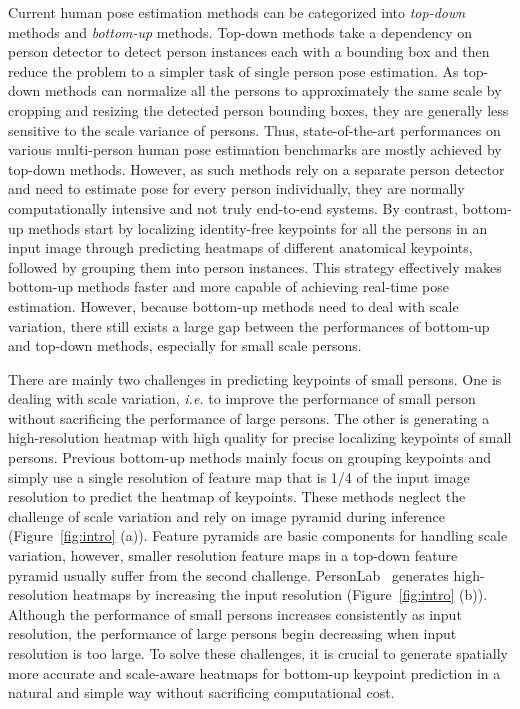 \documentclass[10pt,twocolumn,letterpaper]{article}
\begin{document}
Current human pose estimation methods can be categorized into \emph{top-down} methods and \emph{bottom-up} methods. Top-down methods \cite{papandreou2017towards,chen2018cascaded,he2017mask,xiao2018simple,sun2019deep,WangSCJDZLMTWLX19,sun2018integral,he2017mask} take a dependency on person detector to detect person instances each with a bounding box and then reduce the problem to a simpler task of single person pose estimation. As top-down methods can normalize all the persons to approximately the same scale by cropping and resizing the detected person bounding boxes, they are generally less sensitive to the scale variance of persons. Thus, state-of-the-art performances on various multi-person human pose estimation benchmarks are mostly achieved by top-down methods. However, as such methods rely on a separate person detector and need to estimate pose for every person individually, they are normally computationally intensive and not truly end-to-end systems. By contrast, bottom-up methods \cite{cao2017realtime,newwell2017associative,papandreou2018personlab,kreiss2019pifpaf} start by localizing identity-free keypoints for all the persons in an input image through predicting heatmaps of different anatomical keypoints, followed by grouping them into person instances. This strategy effectively makes bottom-up methods faster and more capable of achieving real-time pose estimation. However, because bottom-up methods need to deal with scale variation, there still exists a large gap between the performances of bottom-up and top-down methods, especially for small scale persons.

There are mainly two challenges in predicting keypoints of small persons. One is dealing with scale variation, \emph{i.e.} to improve the performance of small person without sacrificing the performance of large persons. The other is generating a high-resolution heatmap with high quality for precise localizing keypoints of small persons. 
Previous bottom-up methods \cite{cao2017realtime,newwell2017associative,papandreou2018personlab,kreiss2019pifpaf} mainly focus on grouping keypoints and simply use a single resolution of feature map that is 1/4 of the input image resolution to predict the heatmap of keypoints. These methods neglect the challenge of scale variation and rely on image pyramid during inference (Figure~\ref{fig:intro} (a)). Feature pyramids are basic components for handling scale variation, however, smaller resolution feature maps in a top-down feature pyramid usually suffer from the second challenge. PersonLab~\cite{papandreou2018personlab} generates high-resolution heatmaps by increasing the input resolution (Figure~\ref{fig:intro} (b)). Although the performance of small persons increases consistently as input resolution, the performance of large persons begin decreasing when input resolution is too large. To solve these challenges, it is crucial to generate spatially more accurate and scale-aware heatmaps for bottom-up keypoint prediction in a natural and simple way without sacrificing computational cost.
\end{document}
